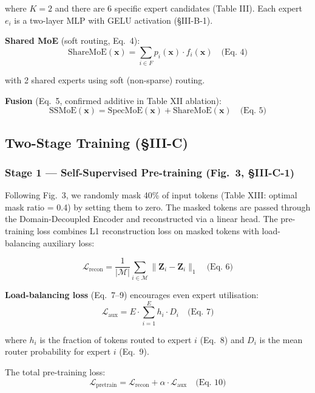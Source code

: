 \documentclass[conference]{IEEEtran}
\begin{document}
where $K = 2$ and there are 6 specific expert candidates (Table III). Each expert $e_i$ is a two-layer MLP with GELU activation (\S III-B-1).

\textbf{Shared MoE} (soft routing, Eq.~4):
\begin{equation}
    \text{ShareMoE}(\mathbf{x}) = \sum_{i \in F} p_i(\mathbf{x}) \cdot f_i(\mathbf{x}) \quad \text{(Eq. 4)}
\end{equation}

with 2 shared experts using soft (non-sparse) routing.

\textbf{Fusion} (Eq.~5, confirmed additive in Table XII ablation):
\begin{equation}
    \text{SSMoE}(\mathbf{x}) = \text{SpecMoE}(\mathbf{x}) + \text{ShareMoE}(\mathbf{x}) \quad \text{(Eq. 5)}
\end{equation}

\subsection{Two-Stage Training (\S III-C)}

\subsubsection{Stage 1 — Self-Supervised Pre-training (Fig.~3, \S III-C-1)}

Following Fig.~3, we randomly mask 40\% of input tokens (Table XIII: optimal mask ratio = 0.4) by setting them to zero. The masked tokens are passed through the Domain-Decoupled Encoder and reconstructed via a linear head. The pre-training loss combines L1 reconstruction loss on masked tokens with load-balancing auxiliary loss:

\begin{equation}
    \mathcal{L}_\text{recon} = \frac{1}{|\mathcal{M}|} \sum_{i \in \mathcal{M}} \|\hat{\mathbf{Z}}_i - \mathbf{Z}_i\|_1 \quad \text{(Eq. 6)}
\end{equation}

\textbf{Load-balancing loss} (Eq.~7--9) encourages even expert utilisation:
\begin{equation}
    \mathcal{L}_\text{aux} = E \cdot \sum_{i=1}^{E} h_i \cdot D_i \quad \text{(Eq. 7)}
\end{equation}

where $h_i$ is the fraction of tokens routed to expert $i$ (Eq.~8) and $D_i$ is the mean router probability for expert $i$ (Eq.~9).

The total pre-training loss:
\begin{equation}
    \mathcal{L}_\text{pretrain} = \mathcal{L}_\text{recon} + \alpha \cdot \mathcal{L}_\text{aux} \quad \text{(Eq. 10)}
\end{equation}
\end{document}
